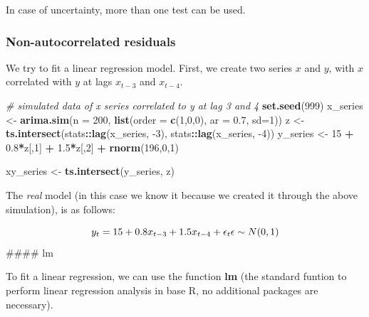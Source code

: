 \documentclass[
]{article}
\newenvironment{Shaded}{\begin{snugshade}}{\end{snugshade}}
\newcommand{\CommentTok}[1]{\textcolor[rgb]{0.56,0.35,0.01}{\textit{#1}}}
\newcommand{\DataTypeTok}[1]{\textcolor[rgb]{0.13,0.29,0.53}{#1}}
\newcommand{\DecValTok}[1]{\textcolor[rgb]{0.00,0.00,0.81}{#1}}
\newcommand{\FloatTok}[1]{\textcolor[rgb]{0.00,0.00,0.81}{#1}}
\newcommand{\KeywordTok}[1]{\textcolor[rgb]{0.13,0.29,0.53}{\textbf{#1}}}
\newcommand{\NormalTok}[1]{#1}
\newcommand{\OperatorTok}[1]{\textcolor[rgb]{0.81,0.36,0.00}{\textbf{#1}}}
\newcommand{\StringTok}[1]{\textcolor[rgb]{0.31,0.60,0.02}{#1}}
\begin{document}
In case of uncertainty, more than one test can be used.

\hypertarget{non-autocorrelated-residuals}{%
\subsubsection{Non-autocorrelated residuals}\label{non-autocorrelated-residuals}}

We try to fit a linear regression model. First, we create two series \(x\) and \(y\), with \(x\) correlated with \(y\) at lags \(x_{t-3}\) and \(x_{t-4}\).

\begin{Shaded}
\begin{Highlighting}[]
\CommentTok{# simulated data of x series correlated to y at lag 3 and 4}
\KeywordTok{set.seed}\NormalTok{(}\DecValTok{999}\NormalTok{)}
\NormalTok{x_series <-}\StringTok{ }\KeywordTok{arima.sim}\NormalTok{(}\DataTypeTok{n =} \DecValTok{200}\NormalTok{, }\KeywordTok{list}\NormalTok{(}\DataTypeTok{order =} \KeywordTok{c}\NormalTok{(}\DecValTok{1}\NormalTok{,}\DecValTok{0}\NormalTok{,}\DecValTok{0}\NormalTok{), }\DataTypeTok{ar =} \FloatTok{0.7}\NormalTok{, }\DataTypeTok{sd=}\DecValTok{1}\NormalTok{))}
\NormalTok{z <-}\StringTok{ }\KeywordTok{ts.intersect}\NormalTok{(stats}\OperatorTok{::}\KeywordTok{lag}\NormalTok{(x_series, }\DecValTok{-3}\NormalTok{), stats}\OperatorTok{::}\KeywordTok{lag}\NormalTok{(x_series, }\DecValTok{-4}\NormalTok{)) }
\NormalTok{y_series <-}\StringTok{ }\DecValTok{15} \OperatorTok{+}\StringTok{ }\FloatTok{0.8}\OperatorTok{*}\NormalTok{z[,}\DecValTok{1}\NormalTok{] }\OperatorTok{+}\StringTok{ }\FloatTok{1.5}\OperatorTok{*}\NormalTok{z[,}\DecValTok{2}\NormalTok{] }\OperatorTok{+}\StringTok{ }\KeywordTok{rnorm}\NormalTok{(}\DecValTok{196}\NormalTok{,}\DecValTok{0}\NormalTok{,}\DecValTok{1}\NormalTok{)}

\NormalTok{xy_series <-}\StringTok{ }\KeywordTok{ts.intersect}\NormalTok{(y_series, z)}
\end{Highlighting}
\end{Shaded}

The \emph{real} model (in this case we know it because we created it through the above simulation), is as follows:

\[
y_t = 15 + 0.8x_{t-3} + 1.5x_{t-4} + \epsilon_t \\
\epsilon \sim N(0, 1)
\]
\#\#\#\# lm

To fit a linear regression, we can use the function \textbf{lm} (the standard funtion to perform linear regression analysis in base R, no additional packages are necessary).
\end{document}

